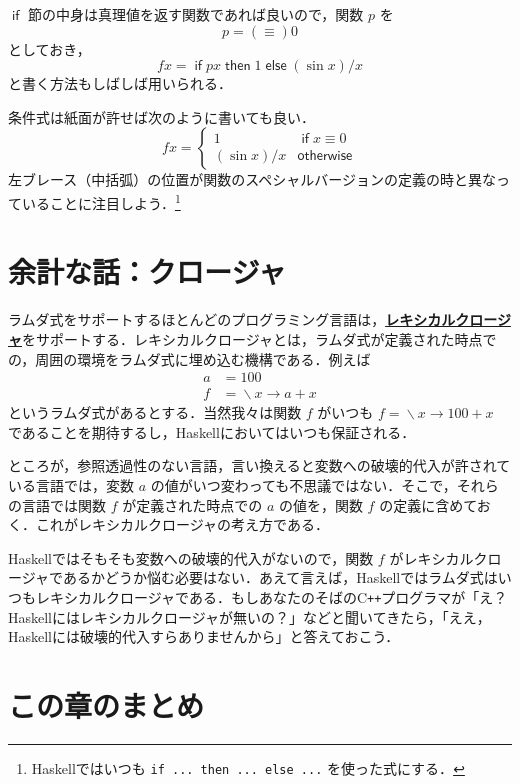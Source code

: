 \documentclass[a4paper,twocolumn]{jsbook}
\newcommand{\programminglanguage}[1]{\textsf{#1}}
\newcommand{\cxx}{\programminglanguage{C}\texttt{++}}
\newcommand{\haskell}{\programminglanguage{Haskell}}
\newcommand{\keyword}[1]{{\underline{\textbf{#1}}}}
\newcommand{\code}[1]{\texttt{#1}}
\newcommand{\mKeyword}[1]{\mathsf{#1}} %
\newcommand{\mIfKeyword}{\mKeyword{if}}
\newcommand{\mElseKeyword}{\mKeyword{else}}
\newcommand{\mOtherwiseKeyword}{\mKeyword{otherwise}}
\newcommand{\mThenKeyword}{\mKeyword{then}}
\DeclareMathOperator{\mElse}{\mElseKeyword}
\DeclareMathOperator{\mIf}{\mIfKeyword}
\DeclareMathOperator{\mOtherwise}{\mOtherwiseKeyword}
\DeclareMathOperator{\mThen}{\mThenKeyword}
\DeclareMathOperator{\mLambda}{\backslash}
\DeclareMathOperator{\mLambdaArrow}{\rightarrow}
\newcommand{\mIfThenElse}[3]{\mIf{#1}\mThen{#2}\mElse{#3}}
\newcommand{\mLambdaExp}[2]{\mLambda{#1}\mLambdaArrow{#2}}
\begin{document}
$\mIf$ 節の中身は真理値を返す関数であれば良いので，関数 $p$ を
\begin{equation}
p=(\equiv)0
\end{equation}
としておき，
\begin{equation}
fx=\mIfThenElse{px}{1}{{}(\sin x)/x}
\end{equation}
と書く方法もしばしば用いられる．

条件式は紙面が許せば次のように書いても良い．
\begin{equation}
fx=\begin{cases}
1&\mIf x\equiv0\\
(\sin x)/x&\mOtherwise
\end{cases}
\end{equation}
左ブレース（中括弧）の位置が関数のスペシャルバージョンの定義の時と異なっていることに注目しよう．\footnote{\haskell ではいつも \code{if ... then ... else ...} を使った式にする．}

\section{余計な話：クロージャ}

ラムダ式をサポートするほとんどのプログラミング言語は，\keyword{レキシカルクロージャ}をサポートする．レキシカルクロージャとは，ラムダ式が定義された時点での，周囲の環境をラムダ式に埋め込む機構である．例えば
\begin{align}
a&=100\\
f&=\mLambdaExp{x}{a+x}
\end{align}
というラムダ式があるとする．当然我々は関数 $f$ がいつも $f=\mLambdaExp{x}{100+x}$ であることを期待するし，\haskell においてはいつも保証される．

ところが，参照透過性のない言語，言い換えると変数への破壊的代入が許されている言語では，変数 $a$ の値がいつ変わっても不思議ではない．そこで，それらの言語では関数 $f$ が定義された時点での $a$ の値を，関数 $f$ の定義に含めておく．これがレキシカルクロージャの考え方である．

\haskell ではそもそも変数への破壊的代入がないので，関数 $f$ がレキシカルクロージャであるかどうか悩む必要はない．あえて言えば，\haskell ではラムダ式はいつもレキシカルクロージャである．もしあなたのそばの\cxx プログラマが「え？\haskell にはレキシカルクロージャが無いの？」などと聞いてきたら，「ええ，\haskell には破壊的代入すらありませんから」と答えておこう．

\section{この章のまとめ}
\end{document}
